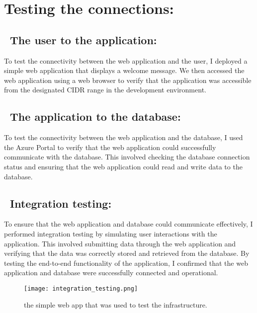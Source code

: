 \section{Testing the connections:}
\subsection*{ \textbullet\ The user to the application:}
To test the connectivity between the web application and the user, I deployed a simple web application that displays a welcome message. We then accessed the web application using a web browser to verify that the application was accessible from the designated CIDR range in the development environment.
\subsection*{ \textbullet\ The application to the database:}
To test the connectivity between the web application and the database, I used the Azure Portal to verify that the web application could successfully communicate with the database. This involved checking the database connection status and ensuring that the web application could read and write data to the database.
\subsection*{ \textbullet\ Integration testing:}
To ensure that the web application and database could communicate effectively, I performed integration testing by simulating user interactions with the application. This involved submitting data through the web application and verifying that the data was correctly stored and retrieved from the database. By testing the end-to-end functionality of the application, I confirmed that the web application and database were successfully connected and operational.
\begin{figure}[htpb]
    \centering
    \texttt{[image: integration\_testing.png]}
    \caption{the simple web app that was used to test the infrastructure.}
    \label{fig:testing}
\end{figure}

